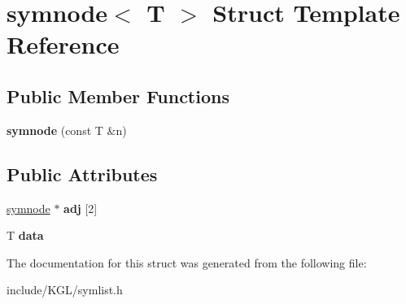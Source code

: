 \hypertarget{structsymnode}{}\section{symnode$<$ T $>$ Struct Template Reference}
\label{structsymnode}
\subsection*{Public Member Functions}
\begin{DoxyCompactItemize}
\item 
\mbox{\label{structsymnode_a30bcafe2d065258082d937d9879a6e5b}} 
{\bfseries symnode} (const T \&n)
\end{DoxyCompactItemize}
\subsection*{Public Attributes}
\begin{DoxyCompactItemize}
\item 
\mbox{\label{structsymnode_aba7e8f525fb4d85417384a6ccff59241}} 
\mbox{\hyperlink{structsymnode}{symnode}} $\ast$ {\bfseries adj} \mbox{[}2\mbox{]}
\item 
\mbox{\label{structsymnode_a079c4145d1af3d5ddab2cc9c7b3e0563}} 
T {\bfseries data}
\end{DoxyCompactItemize}


The documentation for this struct was generated from the following file\+:\begin{DoxyCompactItemize}
\item 
include/\+K\+G\+L/symlist.\+h\end{DoxyCompactItemize}
